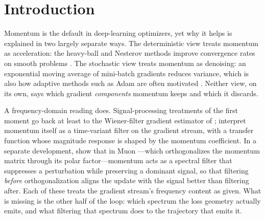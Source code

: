 \documentclass[11pt,a4paper]{article}
\theoremstyle{remark}
\begin{document}
\begin{abstract}
Controlled experiments measure the predictions: the hill loss falls with $\beta$ by the predicted margin and only in the predicted regime; forced-disturbance controls follow the parameter-free gain guides over nearly three orders of magnitude, including the predicted resonant harm; a real network at the edge of stability shows the Nyquist oscillation emerging only at valley confinement; and in mini-batch transformer training, where the momentum benefit grows with the learning rate---to $12\%$ at the largest rate every arm survives, with $\beta=0$ failing outright at the rate above while momentum trains---a large-batch decomposition places the high-frequency content in the mean-loss gradient at the visited iterates, concentrated on the top curvature directions---hill oscillation, not sampling noise---with the filter-first ordering persisting at that scale.
Negative results are reported alongside: deterministic ringing at large $\beta$, a mechanism score that does not rank $\beta$ at transformer scale, and the update-level knee of the deployed Newton--Schulz operator left unmeasured.
\end{abstract}

\section{Introduction}
\label{sec:intro}

Momentum is the default in deep-learning optimizers, yet why it helps is explained in two largely separate ways.
The deterministic view treats momentum as acceleration: the heavy-ball and Nesterov methods improve convergence rates on smooth problems \citep{polyak1964momentum, sutskever2013momentum}.
The stochastic view treats momentum as denoising: an exponential moving average of mini-batch gradients reduces variance, which is also how adaptive methods such as Adam are often motivated \citep{kingma2015adam}.
Neither view, on its own, says which gradient \emph{components} momentum keeps and which it discards.

A frequency-domain reading does.
Signal-processing treatments of the first moment go back at least to the Wiener-filter gradient estimator of \citet{yao2023signal}; \citet{li2025frequency} interpret momentum itself as a time-variant filter on the gradient stream, with a transfer function whose magnitude response is shaped by the momentum coefficient.
In a separate development, \citet{li2026denoise} show that in Muon \citep{jordan2024muon}---which orthogonalizes the momentum matrix through its polar factor---momentum acts as a spectral filter that suppresses a perturbation while preserving a dominant signal, so that filtering \emph{before} orthogonalization aligns the update with the signal better than filtering after.
Each of these treats the gradient stream's frequency content as given.
What is missing is the other half of the loop: which spectrum the loss geometry actually emits, and what filtering that spectrum does to the trajectory that emits it.
\end{document}
